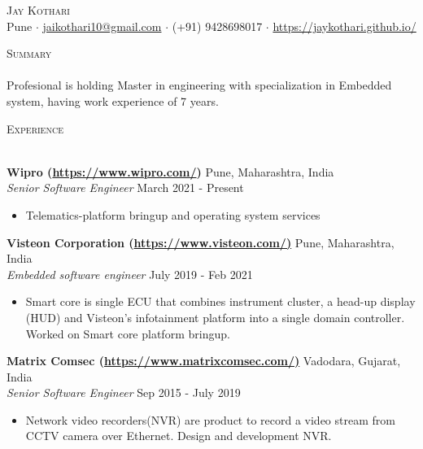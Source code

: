 \documentclass[a4paper]{article}
\newcommand{\lineunder} {
    \vspace*{-8pt} \\
    \hspace*{-18pt} \hrulefill \\
}
\newcommand{\header} [1] {
    {\hspace*{-18pt}\vspace*{6pt} \textsc{#1}}
    \vspace*{-6pt} \lineunder
}
\begin{document}
\vspace*{-40pt}

    

\vspace*{-10pt}
\begin{center}
	{\Huge \scshape {Jay Kothari}}\\
	Pune $\cdot$ \url{jaikothari10@gmail.com} $\cdot$ (+91) 9428698017 $\cdot$ \url{https://jaykothari.github.io/}\\
\end{center}

\header{Summary}
\vspace{1mm}
Profesional is holding Master in engineering with specialization in Embedded system, having work experience of 7 years.
\vspace{2mm}

\header{Experience}
\vspace{1mm}

\textbf{Wipro (\url{https://www.wipro.com/})} \hfill Pune, Maharashtra, India\\
\textit{Senior Software Engineer} \hfill March 2021 - Present\\
\vspace{-1mm}
\begin{itemize} \itemsep 1pt
	\item Telematics-platform bringup and operating system services
\end{itemize}

\textbf{Visteon Corporation (\url{https://www.visteon.com/)}} \hfill Pune, Maharashtra, India\\
\textit{Embedded software engineer} \hfill July 2019 - Feb 2021\\
\vspace{-1mm}
\begin{itemize} \itemsep 1pt
	\item Smart core is single ECU that combines instrument cluster, a head-up display (HUD) and Visteon’s infotainment platform into a single domain controller. Worked on Smart core platform bringup. 
\end{itemize}

\textbf{Matrix Comsec (\url{https://www.matrixcomsec.com/)}} \hfill Vadodara, Gujarat, India\\
\textit{Senior Software Engineer} \hfill Sep 2015 - July 2019\\
\vspace{-1mm}
\begin{itemize} \itemsep 1pt
	\item Network video recorders(NVR) are product to record a video stream from CCTV camera over Ethernet. Design and development NVR.
\end{itemize}
\end{document}
